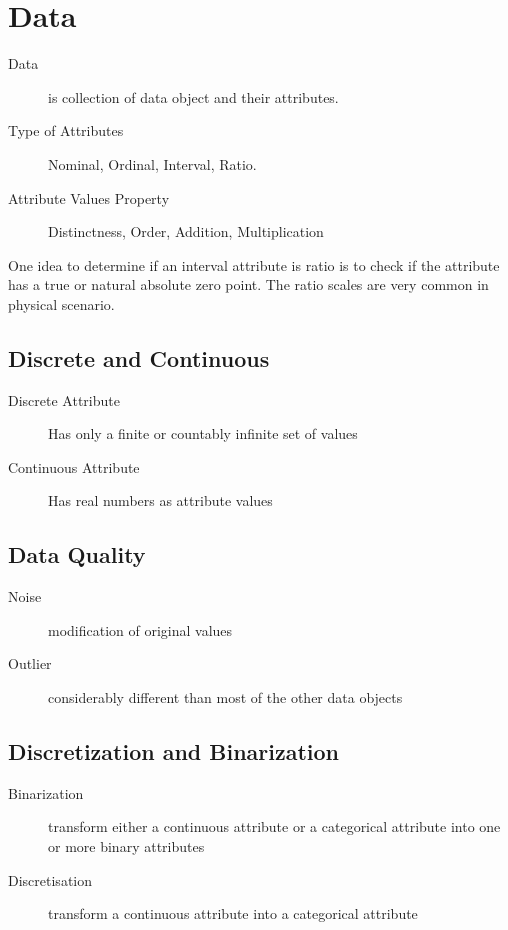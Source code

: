 \chapter{Data} 

\begin{description}
  \item[Data] is collection of data object and their attributes.
  \item[Type of Attributes] Nominal, Ordinal, Interval, Ratio.
  \item[Attribute Values Property] Distinctness, Order, Addition, Multiplication
\end{description} 
\par \noindent
{}One idea to determine if an interval attribute is ratio is to check if the attribute has a true or natural absolute zero point. The ratio scales are very common in physical scenario. 

\section{Discrete and Continuous}

\begin{description}
  \item[Discrete Attribute] Has only a finite or countably infinite set of values
  \item[Continuous Attribute] Has real numbers as attribute values
\end{description}

\section{Data Quality}

\begin{description}
  \item[Noise] modification of original values
  \item[Outlier] considerably different than most of the other data objects
\end{description}

\section{Discretization and Binarization}

\begin{description}
  \item[Binarization] transform either a continuous attribute or a categorical attribute into one or more binary attributes
  \item[Discretisation] transform a continuous attribute into a categorical attribute
\end{description}


